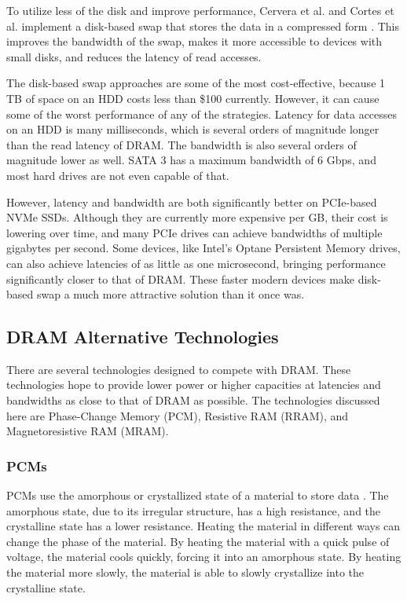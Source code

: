\documentclass[doublespace,nopageskip]{VTthesis}
\begin{document}
To utilize less of the disk and improve performance, Cervera et al. and Cortes et al. implement a disk-based swap that stores the data in a compressed form \cite{diskswapcompression, resurrectswapcompression}. This improves the bandwidth of the swap, makes it more accessible to devices with small disks, and reduces the latency of read accesses.

The disk-based swap approaches are some of the most cost-effective, because 1 TB of space on an HDD costs less than \$100 currently. However, it can cause some of the worst performance of any of the strategies. Latency for data accesses on an HDD is many milliseconds, which is several orders of magnitude longer than the read latency of DRAM. The bandwidth is also several orders of magnitude lower as well. SATA 3 has a maximum bandwidth of 6 Gbps, and most hard drives are not even capable of that.

However, latency and bandwidth are both significantly better on PCIe-based NVMe SSDs. Although they are currently more expensive per GB, their cost is lowering over time, and many PCIe drives can achieve bandwidths of multiple gigabytes per second. Some devices, like Intel's Optane Persistent Memory drives, can also achieve latencies of as little as one microsecond, bringing performance significantly closer to that of DRAM. These faster modern devices make disk-based swap a much more attractive solution than it once was.

\subsection{DRAM Alternative Technologies}\label{ss:dram_alternative_technologies}
There are several technologies designed to compete with DRAM. These technologies hope to provide lower power or higher capacities at latencies and bandwidths as close to that of DRAM as possible. The technologies discussed here are Phase-Change Memory (PCM), Resistive RAM (RRAM), and Magnetoresistive RAM (MRAM).

\subsubsection{PCMs}\label{sss:pcms}
PCMs use the amorphous or crystallized state of a material to store data \cite{pcm1, pcm2}. The amorphous state, due to its irregular structure, has a high resistance, and the crystalline state has a lower resistance. Heating the material in different ways can change the phase of the material. By heating the material with a quick pulse of voltage, the material cools quickly, forcing it into an amorphous state. By heating the material more slowly, the material is able to slowly crystallize into the crystalline state.
\end{document}
